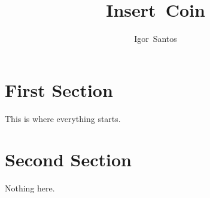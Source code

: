 \documentclass[a4paper]{abnt}
\author{Igor~Santos}
\title{Insert~Coin}
\begin{document}
\maketitle

\section{First Section}
This is where everything starts.

\section{Second Section}
Nothing here.
\end{document}
